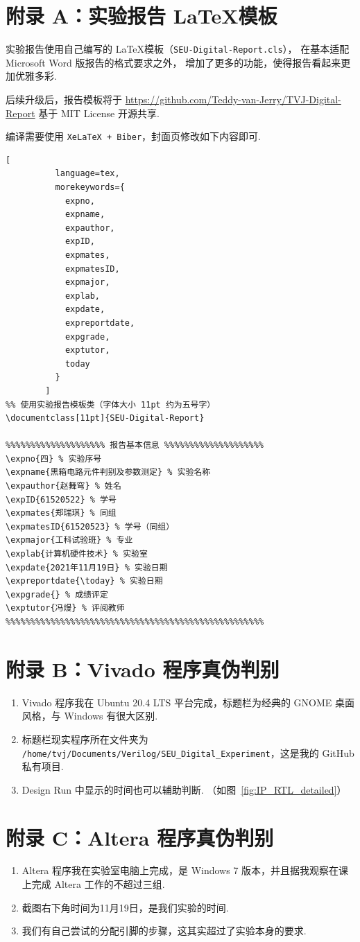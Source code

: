 \documentclass[11pt]{SEU-Digital-Report}
\begin{document}
    \section*{附录 A：实验报告 \LaTeX 模板}

        实验报告使用自己编写的 \LaTeX 模板（\texttt{SEU-Digital-Report.cls}），
        在基本适配 Microsoft Word 版报告的格式要求之外，
        增加了更多的功能，使得报告看起来更加优雅多彩.

        后续升级后，报告模板将于 \url{https://github.com/Teddy-van-Jerry/TVJ-Digital-Report} 基于 MIT License 开源共享.

        编译需要使用 \texttt{XeLaTeX + Biber}，封面页修改如下内容即可.
        \begin{lstlisting}[
          language=tex,
          morekeywords={
            expno,
            expname,
            expauthor,
            expID,
            expmates,
            expmatesID,
            expmajor,
            explab,
            expdate,
            expreportdate,
            expgrade,
            exptutor,
            today
          }
        ]
%% 使用实验报告模板类（字体大小 11pt 约为五号字）
\documentclass[11pt]{SEU-Digital-Report}

%%%%%%%%%%%%%%%%%%%% 报告基本信息 %%%%%%%%%%%%%%%%%%%%
\expno{四} % 实验序号
\expname{黑箱电路元件判别及参数测定} % 实验名称
\expauthor{赵舞穹} % 姓名
\expID{61520522} % 学号
\expmates{郑瑞琪} % 同组
\expmatesID{61520523} % 学号（同组）
\expmajor{工科试验班} % 专业
\explab{计算机硬件技术} % 实验室
\expdate{2021年11月19日} % 实验日期
\expreportdate{\today} % 实验日期
\expgrade{} % 成绩评定
\exptutor{冯熳} % 评阅教师
%%%%%%%%%%%%%%%%%%%%%%%%%%%%%%%%%%%%%%%%%%%%%%%%%%%%
        \end{lstlisting}

    \section*{附录 B：Vivado 程序真伪判别}

    \begin{enumerate}
        \item Vivado 程序我在 Ubuntu 20.4 LTS 平台完成，标题栏为经典的 GNOME 桌面风格，与 Windows 有很大区别.
        \item 标题栏现实程序所在文件夹为 \texttt{/home/tvj/Documents/Verilog/SEU\_Digital\_Experiment}，这是我的 GitHub 私有项目.
        \item Design Run 中显示的时间也可以辅助判断. （如图~\ref{fig:IP_RTL_detailed}）
    \end{enumerate}

    \section*{附录 C：Altera 程序真伪判别}

    \begin{enumerate}
      \item Altera 程序我在实验室电脑上完成，是 Windows 7 版本，并且据我观察在课上完成 Altera 工作的不超过三组.
      \item 截图右下角时间为11月19日，是我们实验的时间.
      \item 我们有自己尝试的分配引脚的步骤，这其实超过了实验本身的要求.
    \end{enumerate}
\end{document}
